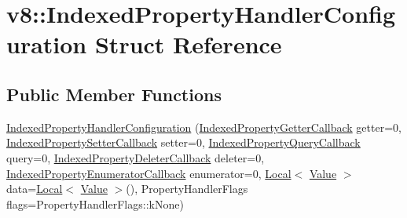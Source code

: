 \hypertarget{structv8_1_1IndexedPropertyHandlerConfiguration}{}\section{v8\+:\+:Indexed\+Property\+Handler\+Configuration Struct Reference}
\label{structv8_1_1IndexedPropertyHandlerConfiguration}
\subsection*{Public Member Functions}
\begin{DoxyCompactItemize}
\item 
\hyperlink{structv8_1_1IndexedPropertyHandlerConfiguration_a1e474ac223c5b502e6eab8b0336f9fe7}{Indexed\+Property\+Handler\+Configuration} (\hyperlink{namespacev8_a48e7816ba64447bf32a25d194588daaf}{Indexed\+Property\+Getter\+Callback} getter=0, \hyperlink{namespacev8_a4ac7cc6185ebc8b6a199f9fa8e6bf5c3}{Indexed\+Property\+Setter\+Callback} setter=0, \hyperlink{namespacev8_a980b62c33eb664783e61e25c3b27f9ee}{Indexed\+Property\+Query\+Callback} query=0, \hyperlink{namespacev8_a53863728de14cde48dd6543207b2f2da}{Indexed\+Property\+Deleter\+Callback} deleter=0, \hyperlink{namespacev8_adbb0a6d5537371953f9ba807d4f6275e}{Indexed\+Property\+Enumerator\+Callback} enumerator=0, \hyperlink{classv8_1_1Local}{Local}$<$ \hyperlink{classv8_1_1Value}{Value} $>$ data=\hyperlink{classv8_1_1Local}{Local}$<$ \hyperlink{classv8_1_1Value}{Value} $>$(), Property\+Handler\+Flags flags=Property\+Handler\+Flags\+::k\+None)
\end{DoxyCompactItemize}

